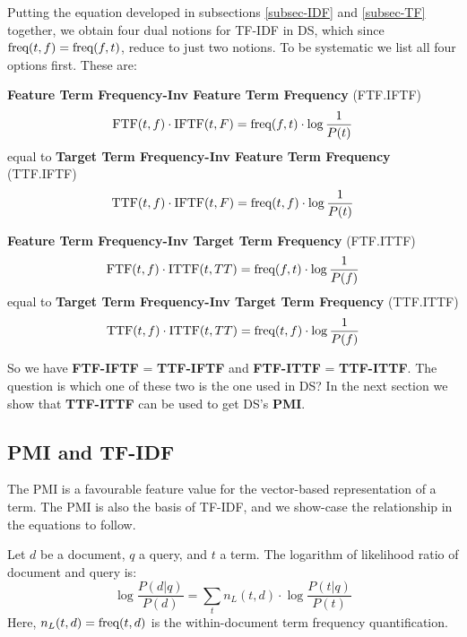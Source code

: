 Putting  the equation developed in subsections \ref{subsec-IDF} and \ref{subsec-TF} together,  we obtain four dual notions  for TF-IDF in DS, which  since $\textmd{freq}(t,f) = \textmd{freq}(f,t)$, reduce to just two notions.  To be systematic we list all four options first. These are:

\begin{definition}
{\bf Feature Term Frequency-Inv Feature Term Frequency} (FTF.IFTF) 
\begin{equation}
\label{ftf-iftf}
\textmd{FTF}(t,f) \cdot \textmd{IFTF}(t, F) =  \textmd{freq}(f, t) \cdot \log{\frac{1}{P(t)}}
\end{equation}
equal  to  {\bf Target Term Frequency-Inv Feature Term Frequency} (TTF.IFTF)
\begin{equation}
\label{ttf-iftf}
\textmd{TTF}(t,f) \cdot \textmd{IFTF}(t, F) =  \textmd{freq}(t,f) \cdot \log{\frac{1}{P(t)}}
\end{equation}
\end{definition}



\begin{definition}
{\bf Feature Term Frequency-Inv Target Term Frequency} (FTF.ITTF)
\begin{equation}
\label{ftf-ittf}
\textmd{FTF}(t,f) \cdot \textmd{ITTF}(t, TT) =  \textmd{freq}(f, t) \cdot \log{\frac{1}{P(f)}}
\end{equation}
equal to {\bf Target Term Frequency-Inv Target Term Frequency} (TTF.ITTF)
\begin{equation}
\label{ttf-ittf}
\textmd{TTF}(t,f) \cdot \textmd{ITTF}(t, TT) =  \textmd{freq}(t, f) \cdot \log{\frac{1}{P(f)}}
\end{equation}
\end{definition}
So we have  {\bf FTF-IFTF}  = {\bf TTF-IFTF}  and  {\bf FTF-ITTF}  = {\bf TTF-ITTF}. The question is 
 which one of these two is the one used in DS? In the next section we show that {\bf TTF-ITTF} can be used to get DS's {\bf PMI}. 

\subsection{PMI and TF-IDF}

The PMI is a favourable feature value for the vector-based representation
of a term.
The PMI is also the basis of TF-IDF, and we show-case the relationship
in the equations to follow.

Let $d$ be a document, $q$ a query, and $t$ a term.
The logarithm of likelihood ratio of document and query is:
\[
\log\frac{P(d|q)}{P(d)} =
	\sum_t n_L(t,d) \cdot \log\frac{P(t|q)}{P(t)}
\]
Here, $n_L(t,d)=\textmd{freq}(t,d)$ is the within-document term frequency
quantification.

